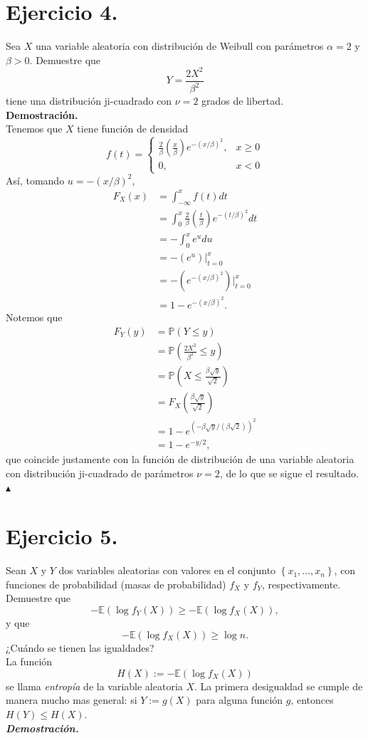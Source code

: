 \documentclass[12pt,a4paper]{article}
\theoremstyle{plain}
\theoremstyle{definition}
\theoremstyle{remark}
\renewcommand{\P}{\mathbb{P}}
\newcommand{\E}{\mathbb{E}}
\newcommand{\llaves}[1]{\left\{#1\right\}}
\begin{document}
\section*{Ejercicio 4.}
Sea $X$ una variable aleatoria con distribución de Weibull con parámetros $\alpha = 2$ y $\beta > 0$. Demuestre que
\[
Y = \dfrac{2X^2}{\beta^2}
\]
tiene una distribución ji-cuadrado con $\nu = 2$ grados de libertad.\\
\textbf{Demostración.} \\
Tenemos que $X$ tiene función de densidad
\[
f(t)=
\begin{cases}
    \frac{2}{\beta}\left(\frac{x}{\beta}\right)e^{-\left(x/\beta\right)^2}, &x \geq 0 \\
    0, &x<0
\end{cases}
\]
Así, tomando $u=-(x/\beta)^2$,
\begin{align*}
    F_X(x) &= \int_{-\infty}^{x}f(t)dt \\
    &= \int_{0}^{x}\frac{2}{\beta}\left(\frac{t}{\beta}\right)e^{-\left(t/\beta\right)^2}dt \\
    &= -\int_{0}^{x}e^udu \\
    &= -\left(e^u\right)\Big|_{t=0}^x \\
    &= -\left(e^{-(x/\beta)^2}\right)\Big|_{t=0}^x \\
    &= 1-e^{-(x/\beta)^2}.
\end{align*}
Notemos que
\begin{align*}
    F_Y(y) &= \P(Y\leq y) \\
    &= \P\left(\frac{2X^2}{\beta^2}\leq y\right) \\
    &= \P\left(X\leq \frac{\beta\sqrt{y}}{\sqrt{2}}\right) \\
    &= F_X\left(\frac{\beta\sqrt{y}}{\sqrt{2}}\right) \\
    &= 1-e^{\left(-\beta\sqrt{y}/(\beta\sqrt{2})\right)^2} \\
    &= 1-e^{-y/2},
\end{align*}
que coincide justamente con la función de distribución de una variable aleatoria con distribución ji-cuadrado de parámetros $\nu=2$,
de lo que se sigue el resultado. \hfill $\blacktriangle$

\section*{Ejercicio 5.}
Sean $X$ y $Y$ dos variables aleatorias con valores en el conjunto $\llaves{x_1, \dots, x_n}$, con funciones de probabilidad (masas de probabilidad) $f_X$ y $f_Y$, respectivamente. Demuestre que
\[
- \E ( \log f_Y (X)) \geq - \E ( \log f_X (X)),
\]
y que
\[
- \E( \log f_X (X)) \geq \log n.
\]
¿Cuándo se tienen las igualdades?\\
La función
\[
H(X) := - \E (\log f_X (X))
\]
se llama \textit{entropía} de la variable aleatoria $X$. La primera desigualdad se cumple de manera mucho mas general: si $Y := g(X)$ para alguna función $g$, entonces $H(Y) \leq H(X)$.\\
\textbf{\textit{Demostración.}}
\end{document}
